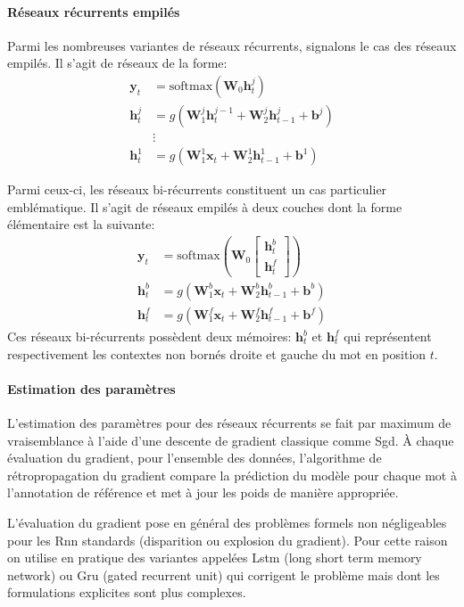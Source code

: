 \documentclass[11pt,openany]{book}
\begin{document}
\paragraph{Réseaux récurrents empilés}
Parmi les nombreuses variantes de réseaux récurrents, signalons le cas des
réseaux empilés. Il s'agit de réseaux de la forme: 
\begin{align}
\mathbf{y}_t &= \text{softmax}(\mathbf{W}_0 \mathbf{h}^j_t)\\
\mathbf{h}^j_t &= g(\mathbf{W}^j_1\mathbf{h}^{j-1}_t + \mathbf{W}^j_2 \mathbf{h}^j_{t-1}+\mathbf{b}^j )\\
& \vdots\\
\mathbf{h}^1_t &= g(\mathbf{W}^1_1\mathbf{x}_t + \mathbf{W}^1_2 \mathbf{h}^1_{t-1}+\mathbf{b}^1 )
\end{align}

Parmi ceux-ci, les réseaux bi-récurrents constituent un cas particulier emblématique. Il
s'agit de réseaux empilés à deux couches dont la forme élémentaire est
la suivante:
\begin{align}
\mathbf{y}_t &= \text{softmax}(\mathbf{W}_0 \left[ \begin{array}{c}\mathbf{h}^b_t \\\mathbf{h}^f_t \end{array}\right])\\
\mathbf{h}^b_t &= g(\mathbf{W}^b_1\mathbf{x}_t + \mathbf{W}^b_2 \mathbf{h}^b_{t-1}+\mathbf{b}^b )\\
\mathbf{h}^f_t &= g(\mathbf{W}^f_1\mathbf{x}_t + \mathbf{W}^f_2 \mathbf{h}^f_{t-1}+\mathbf{b}^f )
\end{align}
Ces réseaux bi-récurrents possèdent deux mémoires: $\mathbf{h}^b_t$ et
$\mathbf{h}^f_t$ qui représentent respectivement les contextes non
bornés droite et gauche du mot en position $t$. 


\paragraph{Estimation des paramètres} L'estimation des paramètres pour
des réseaux récurrents se fait par maximum de vraisemblance à l'aide d'une descente de gradient
classique comme {\sc Sgd}. 
\`A chaque évaluation du gradient, pour l'ensemble des données,
l'algorithme de rétropropagation du gradient compare la prédiction du
modèle pour chaque mot à l'annotation de référence et met à jour les
poids de manière appropriée.

L'évaluation du gradient pose en général des problèmes formels
non négligeables pour les {\sc Rnn} standards (disparition ou explosion du gradient). Pour cette raison on
utilise en pratique des  variantes appelées {\sc Lstm} (long short
term memory network) ou {\sc Gru} (gated recurrent unit)
qui corrigent le problème mais dont les formulations explicites sont plus complexes.
\end{document}
